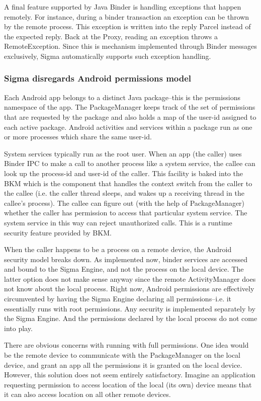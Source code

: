 \documentclass[prodmode]{acmlarge}
\begin{document}
A final feature supported by Java Binder is handling exceptions that happen remotely. For instance, during a binder transaction an exception can be thrown by the remote process. This exception is written into the reply Parcel instead of the expected reply. Back at the Proxy, reading an exception throws a RemoteException. Since this is mechanism implemented through Binder messages exclusively, Sigma automatically supports such exception handling.

\subsubsection{Sigma disregards Android permissions model}
\label{sec:DealingWithAndroidPermissions}
Each Android app belongs to a distinct Java package--this is the permissions namespace of the app. The PackageManager keeps track of the set of permissions that are requested by the package and also holds a map of the user-id assigned to each active package. Android activities and services within a package run as one or more processes which share the same user-id.

System services typically run as the root user. When an app (the caller) uses Binder IPC to make a call to another process like a system service, the callee can look up the process-id and user-id of the caller. This facility is baked into the BKM which is the component that handles the context switch from the caller to the callee (i.e. the caller thread sleeps, and wakes up a receiving thread in the callee's process). The callee can figure out (with the help of PackageManager) whether the caller has permission to access that particular system service. The system service in this way can reject unauthorized calls. This is a runtime security feature provided by BKM.

When the caller happens to be a process on a remote device, the Android security model breaks down. As implemented now, binder services are accessed and bound to the Sigma Engine, and not the process on the local device. The latter option does not make sense anyway since the remote ActivityManager does not know about the local process. Right now, Android permissions are effectively circumvented by having the Sigma Engine declaring all permissions--i.e. it essentially runs with root permissions. Any security is implemented separately by the Sigma Engine. And the permissions declared by the local process do not come into play.

There are obvious concerns with running with full permissions. One idea would be the remote device to communicate with the PackageManager on the local device, and grant an app all the permissions it is granted on the local device. However, this solution does not seem entirely satisfactory. Imagine an application requesting permission to access location of the local (its own) device means that it can also access location on all other remote devices.
\end{document}
